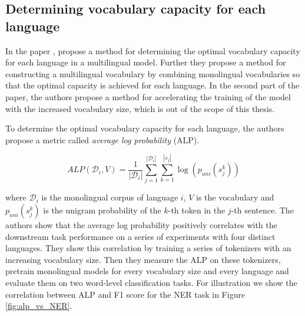 




\subsection{Determining vocabulary capacity for each language}

In the paper , \citeauthor{zheng_allocating_2021} propose a method for determining the optimal vocabulary capacity for each language in a multilingual model. Further they propose a method for constructing a multilingual vocabulary by combining monolingual vocabularies so that the optimal capacity is achieved for each language. In the second part of the paper, the authors propose a method for accelerating the training of the model with the increased vocabulary size, which is out of the scope of this thesis.



To determine the optimal vocabulary capacity for each language, the authors propose a metric called \textit{average log probability} (ALP). 

$$
ALP(\mathcal{D}_i, V) = \frac{1}{|\mathcal{D}_i|} \sum_{j=1}^{|\mathcal{D}_i|} \sum_{k=1}^{|s_j|} \log(p_{uni}(s^k_{j}))
$$

where $\mathcal{D}_i$ is the monolingual corpus of language $i$, $V$ is the vocabulary and $p_{uni}(s^k_{j})$ is the unigram probability of the $k$-th token in the $j$-th sentence. The authors show that the average log probability positively correlates with the downstream task performance on a series of experiments with four distinct languages. They show this correlation by training a series of tokenizers with an increasing vocabulary size. Then they measure the ALP on these tokenizers, pretrain monolingual models for every vocabulary size and every language and evaluate them on two word-level classification tasks. For illustration we show the correlation between ALP and F1 score for the NER task in Figure \ref{fig:alp_vs_NER}. 

